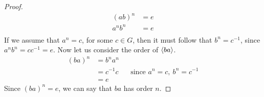 \documentclass{article}
\begin{document}
\begin{enumerate}
{\begin{proof}
\begin{align*}
                (ab)^n & = e \\
                a^nb^n & = e \\
            \end{align*}
            If we assume that $a^n = c$, for some $c \in G$, then it must follow that $b^n = c^{-1}$, since $a^nb^n = cc^{-1} = e$. Now let us consider the order of $\langle ba \rangle$.
            \begin{align*}
                (ba)^n & = b^na^n \\
                & = c^{-1}c && \text{since $a^n = c,~b^n = c^{-1}$}\\
                & = e
            \end{align*}
            Since $(ba)^n = e$, we can say that $ba$ has order $n$.
        \end{proof}
    }
\end{enumerate}
\end{document}
